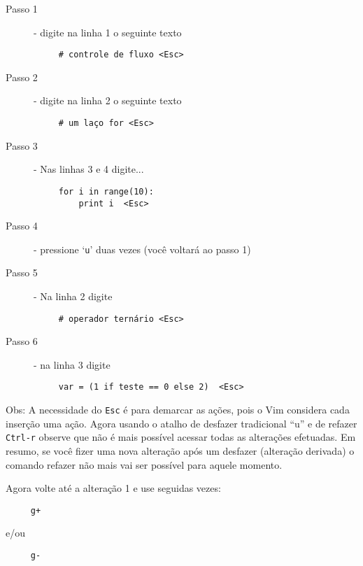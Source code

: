 \begin{description}
\item [Passo 1] - digite na linha 1 o seguinte texto
\begin{verbatim}
     # controle de fluxo <Esc>
\end{verbatim}

\item [Passo 2] - digite na linha 2 o seguinte texto
\begin{verbatim}
     # um laço for <Esc>
\end{verbatim}

\item [Passo 3] - Nas linhas 3 e 4 digite...

\begin{verbatim}
     for i in range(10):
         print i  <Esc>
\end{verbatim}

\item [Passo 4] - pressione `{\tt u}' duas vezes (você voltará ao passo 1)
\item [Passo 5] - Na linha 2 digite

\begin{verbatim}
     # operador ternário <Esc>
\end{verbatim}

\item [Passo 6] - na linha 3 digite

\begin{verbatim}
     var = (1 if teste == 0 else 2)  <Esc>
\end{verbatim}

\end{description}

Obs: A necessidade do {\tt Esc} é para demarcar as ações, pois o Vim
considera cada inserção uma ação.  Agora usando o atalho de desfazer
tradicional ``u'' e de refazer {\tt Ctrl-r} observe que não é mais possível
acessar todas as alterações efetuadas. Em resumo, se você fizer uma
nova alteração após um desfazer (alteração derivada) o comando refazer
não mais vai ser possível para aquele momento. 

Agora volte até a alteração 1 e use seguidas vezes:

\begin{verbatim}
     g+
\end{verbatim}

e/ou

\begin{verbatim}
     g-
\end{verbatim}

